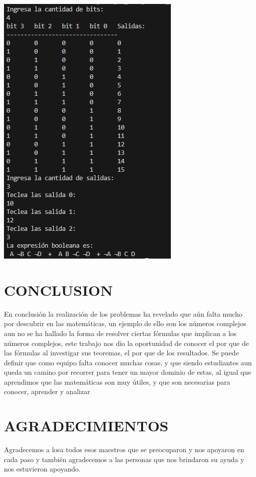 \documentclass{IEEEcsmag}
\begin{document}
\begin{enumerate}
    \centering
    \includegraphics[width=0.5\linewidth]{./latex_imagenes/Img_ejer6_10.jpg}  \\
    


    
    
\end{enumerate}






\section{CONCLUSION}
En conclusión la realización de los problemas ha revelado que aún falta mucho por descubrir en las matemáticas, un ejemplo de ello son los números complejos aun no se ha hallado la forma de resolver ciertas fórmulas que implican a los números complejos, este trabajo nos dio la oportunidad de conocer el por que de las fórmulas al investigar sus teoremas, el por que de los resultados. Se puede definir que como equipo falta conocer muchas cosas, y que siendo estudiantes aun queda un camino por recorrer para tener un mayor dominio de estas, al igual que aprendimos que las matemáticas son muy útiles, y que son necesarias para conocer, aprender y analizar
\vspace*{-8pt}


\section{AGRADECIMIENTOS}
Agradecemos a losa todos esos maestros que se preocuparon y nos apoyaron en cada paso y también agradecemos a las personas que nos brindaron su ayuda y nos estuvieron apoyando.
\end{document}
